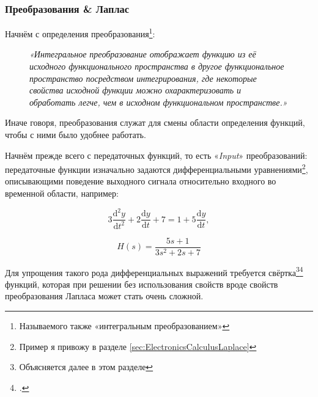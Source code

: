 \documentclass[a4paper, 10pt, final]{article} %
\newcommand{\parenciteit}[2]{\textit{\parencite[#1]{#2}}} %
\begin{document}
    \begin{samepage}%
        \subsubsection{Преобразования \& Лаплас} \label{sec:TransformsAndLaplace}
        Начнём с определения преобразования\footnote{Называемого также «интегральным преобразованием»}: \nopagebreak
        \begin{figure}[H]
            \Centering
            \vspace{1ex}
            \textit{«Интегральное преобразование отображает функцию из её исходного функционального пространства в другое функциональное пространство посредством интегрирования, где некоторые свойства исходной функции можно охарактеризовать и обработать легче, чем в исходном функциональном пространстве.» }

            \RaggedLeft
            \vspace{1ex}

            \scriptsize{\parenciteit{}{Transform:Wiki}}
            \vspace{1ex}
        \end{figure}
        \noindent Иначе говоря, преобразования служат для смены области определения функций, чтобы с ними было удобнее работать.
    \end{samepage}%

    \begin{samepage}%
        Начнём прежде всего с передаточных функций, то есть «\emph{Input}» преобразований: передаточные функции изначально задаются дифференциальными уравнениями\footnote{Пример я привожу в разделе \ref{sec:ElectronicsCalculusLaplace}}, описывающими поведение выходного сигнала относительно входного во временной области, например:
        \begin{figure}[H]
            \centering
            \begin{minipage}[b]{.3\linewidth}
                \centering
                \[
                    3\frac{\mathrm{d}^2y}{\mathrm{d}t^2} + 2\frac{\mathrm{d}y}{\mathrm{d}t} + 7 = 1 + 5\frac{\mathrm{d}y}{\mathrm{d}t} \mathrm{,}
                \]
            \end{minipage}
            \hspace{0.04\linewidth}
            \begin{minipage}[b]{.3\linewidth}
                \centering
                \[
                    H(s) = \frac{5s + 1}{3s^2 + 2s + 7}
                \]
            \end{minipage}
        \end{figure}
        \noindent Для упрощения такого рода дифференциальных выражений требуется свёртка\footnote{Объясняется далее в этом разделе}\:\footcite[]{Convolution:Wiki} функций, которая при решении без использования свойств вроде свойств преобразования Лапласа может стать очень сложной.
    \end{samepage}%
\end{document}
